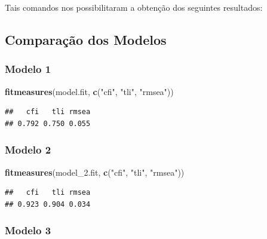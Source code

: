 \documentclass[
  12pt,
]{article}
\newenvironment{Shaded}{\begin{snugshade}}{\end{snugshade}}
\newcommand{\FloatTok}[1]{\textcolor[rgb]{0.00,0.00,0.81}{#1}}
\newcommand{\KeywordTok}[1]{\textcolor[rgb]{0.13,0.29,0.53}{\textbf{#1}}}
\newcommand{\NormalTok}[1]{#1}
\newcommand{\StringTok}[1]{\textcolor[rgb]{0.31,0.60,0.02}{#1}}
\begin{document}
\normalsize
\onehalfspacing

Tais comandos nos possibilitaram a obtenção dos seguintes resultados:

\scriptsize
\singlespacing

\hypertarget{comparauxe7uxe3o-dos-modelos-1}{%
\subsection{Comparação dos
Modelos}\label{comparauxe7uxe3o-dos-modelos-1}}

\hypertarget{modelo-1-1}{%
\subsubsection{Modelo 1}\label{modelo-1-1}}

\begin{Shaded}
\begin{Highlighting}[]
\KeywordTok{fitmeasures}\NormalTok{(model.fit, }\KeywordTok{c}\NormalTok{(}\StringTok{"cfi"}\NormalTok{, }\StringTok{"tli"}\NormalTok{, }\StringTok{"rmsea"}\NormalTok{))}
\end{Highlighting}
\end{Shaded}

\begin{verbatim}
##   cfi   tli rmsea 
## 0.792 0.750 0.055
\end{verbatim}

\hypertarget{modelo-2-2}{%
\subsubsection{Modelo 2}\label{modelo-2-2}}

\begin{Shaded}
\begin{Highlighting}[]
\KeywordTok{fitmeasures}\NormalTok{(model\_}\FloatTok{2.}\NormalTok{fit, }\KeywordTok{c}\NormalTok{(}\StringTok{"cfi"}\NormalTok{, }\StringTok{"tli"}\NormalTok{, }\StringTok{"rmsea"}\NormalTok{))}
\end{Highlighting}
\end{Shaded}

\begin{verbatim}
##   cfi   tli rmsea 
## 0.923 0.904 0.034
\end{verbatim}

\hypertarget{modelo-3-1}{%
\subsubsection{Modelo 3}\label{modelo-3-1}}
\end{document}
